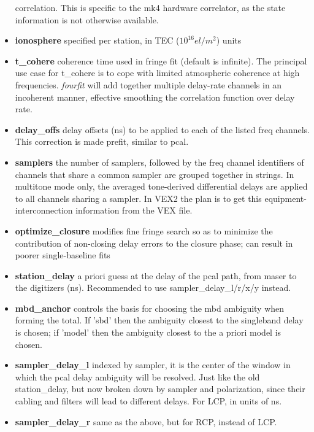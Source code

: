 \begin{itemize}
             correlation. This is specific to the mk4 hardware correlator, as the state
             information is not otherwise available.
\item[]\textbf{ionosphere} specified per station, in TEC ($10^{16}el/m^2$) units
\item[]\textbf{t\_cohere}  coherence time used in fringe fit (default is infinite). The
             principal use case for t\_cohere is to cope with limited atmospheric coherence
             at high frequencies. \textit{fourfit} will add together multiple delay-rate channels
             in an incoherent manner, effective smoothing the correlation function over
             delay rate.
\item[]\textbf{delay\_offs} delay offsets (ns) to be applied to each of the listed freq
             channels. This correction is made prefit, similar to pcal.
\item[]\textbf{samplers}  the number of samplers, followed by the freq channel 
             identifiers of channels that share a common sampler are
             grouped together in strings. In multitone mode only, the
             averaged tone-derived differential delays are applied to 
             all channels sharing a sampler. In VEX2 the plan is to get this
             equipment-interconnection information from the VEX file.
\item[]\textbf{optimize\_closure} modifies fine fringe search so as to minimize the
             contribution of non-closing delay errors to the closure phase;
             can result in poorer single-baseline fits
\item[]\textbf{station\_delay} a priori guess at the delay of the pcal path, from maser
             to the digitizers (ns). Recommended to use 
             sampler\_delay\_l/r/x/y instead.
\item[]\textbf{mbd\_anchor} controls the basis for choosing the mbd ambiguity when
             forming the total. If 'sbd' then the ambiguity closest to
             the singleband delay is chosen; if 'model' then the
             ambiguity closest to the a priori model is chosen.
\item[]\textbf{sampler\_delay\_l} indexed by sampler, it is the center of the window
             in which the pcal delay ambiguity will be resolved. Just like
             the old station\_delay, but now broken down by sampler and
             polarization, since their cabling and filters will lead
             to different delays. For LCP, in units of ns.
\item[]\textbf{sampler\_delay\_r} same as the above, but for RCP, instead of LCP.

\end{itemize}
